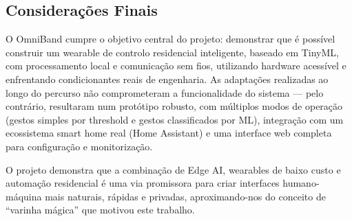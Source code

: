\documentclass[11pt, a4paper]{article}
\begin{document}
\subsection{Considerações Finais}

O OmniBand cumpre o objetivo central do projeto: demonstrar que é possível construir um wearable de controlo residencial inteligente, baseado em TinyML, com processamento local e comunicação sem fios, utilizando hardware acessível e enfrentando condicionantes reais de engenharia. As adaptações realizadas ao longo do percurso não comprometeram a funcionalidade do sistema — pelo contrário, resultaram num protótipo robusto, com múltiplos modos de operação (gestos simples por threshold e gestos classificados por ML), integração com um ecossistema smart home real (Home Assistant) e uma interface web completa para configuração e monitorização.

O projeto demonstra que a combinação de Edge AI, wearables de baixo custo e automação residencial é uma via promissora para criar interfaces humano-máquina mais naturais, rápidas e privadas, aproximando-nos do conceito de ``varinha mágica'' que motivou este trabalho.
\end{document}
